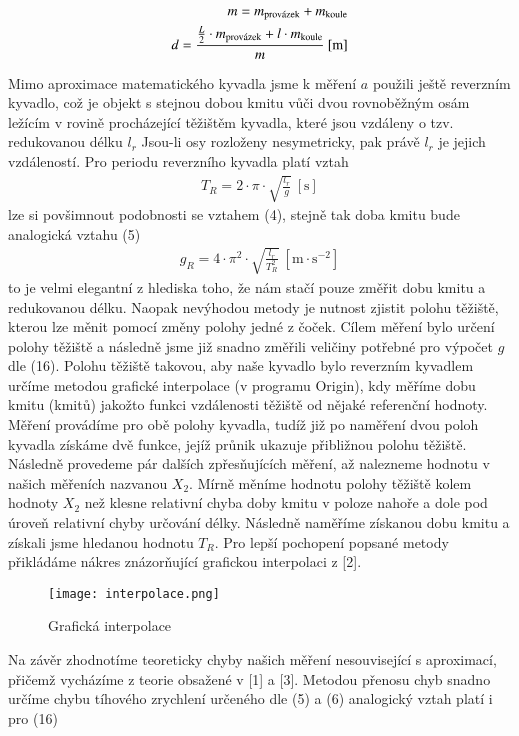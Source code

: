 \documentclass{article}
\begin{document}
\begin{align}
m = m_{\textnormal{provázek}} + m_{\textnormal{koule}} \\
d =\frac{\frac{L}{2}\cdot m_{\textnormal{provázek}} + l \cdot m_{\textnormal{koule}}}{m} \: \mathrm{[m]}
\end{align}
\par Mimo aproximace matematického kyvadla jsme k měření $a$ použili ještě reverzním kyvadlo, což je objekt s stejnou dobou kmitu vůči dvou rovnoběžným osám ležícím v rovině procházející těžištěm kyvadla, které jsou vzdáleny o tzv. redukovanou délku $l_{r}$ Jsou-li osy rozloženy nesymetricky, pak právě $l_{r}$ je jejich vzdáleností. Pro periodu reverzního kyvadla platí vztah
\begin{align}
T_{R} = 2 \cdot \pi \cdot \sqrt{\frac{l_{r}}{g}}\: \mathrm{[s]}
\end{align}
lze si povšimnout podobnosti se vztahem (4), stejně tak doba kmitu bude analogická vztahu (5)
\begin{align}
g_{R} = 4 \cdot \pi^{2} \cdot \sqrt{\frac{l_{r}}{T_{R}^{2}}}\: \mathrm{[m \cdot s^{-2}]}
\end{align}
to je velmi elegantní z hlediska toho, že nám stačí pouze změřit dobu kmitu a redukovanou délku. Naopak nevýhodou metody je nutnost zjistit polohu těžiště, kterou lze měnit pomocí změny polohy jedné z čoček. Cílem měření bylo určení polohy těžiště a následně jsme již snadno změřili veličiny potřebné pro výpočet $g$ dle (16). Polohu těžiště takovou, aby naše kyvadlo bylo reverzním kyvadlem určíme metodou grafické interpolace (v programu Origin), kdy měříme dobu kmitu (kmitů) jakožto funkci vzdálenosti těžiště od nějaké referenční hodnoty. Měření provádíme pro obě polohy kyvadla, tudíž již po naměření dvou poloh kyvadla získáme dvě funkce, jejíž průnik ukazuje přibližnou polohu těžiště. Následně provedeme pár dalších zpřesňujících měření, až nalezneme hodnotu v našich měřeních nazvanou $X_{2}$. Mírně měníme hodnotu polohy těžiště kolem hodnoty $X_{2}$ než klesne relativní chyba doby kmitu v poloze nahoře a dole pod úroveň relativní chyby určování délky. Následně naměříme získanou dobu kmitu a získali jsme hledanou hodnotu $T_{R}$. Pro lepší pochopení popsané metody přikládáme nákres znázorňující grafickou interpolaci z [2].
\begin{figure}[H]
\centering
\caption{Grafická interpolace}
\texttt{[image: interpolace.png]}
\end{figure}
\par Na závěr zhodnotíme teoreticky chyby našich měření nesouvisející s aproximací, přičemž vycházíme z teorie obsažené v [1] a [3]. Metodou přenosu chyb snadno určíme chybu tíhového zrychlení určeného dle (5) a (6)  analogický vztah platí i pro (16)
\end{document}
